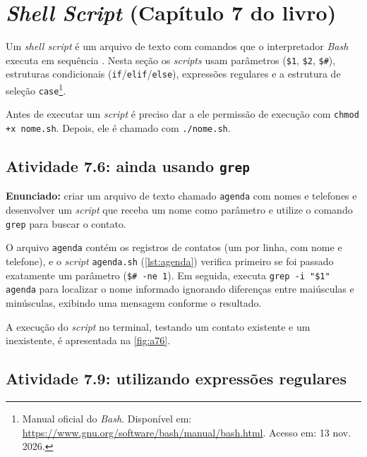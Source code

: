 \chapter{\textit{Shell Script} (Capítulo 7 do livro)}\label{cap:linux7}

Um \textit{shell script} é um arquivo de texto com comandos que o interpretador
\textit{Bash} executa em sequência \cite{peixoto2013}. Nesta seção os \textit{scripts} usam
parâmetros (\texttt{\$1}, \texttt{\$2}, \texttt{\$\#}), estruturas condicionais
(\texttt{if}/\texttt{elif}/\texttt{else}), expressões regulares e a estrutura de seleção
\texttt{case}\footnote{Manual oficial do \textit{Bash}. Disponível em:
\url{https://www.gnu.org/software/bash/manual/bash.html}. Acesso em: 13 nov. 2026.}.

Antes de executar um \textit{script} é preciso dar a ele permissão de execução com
\texttt{chmod +x nome.sh}. Depois, ele é chamado com \texttt{./nome.sh}.

\section{Atividade 7.6: ainda usando \texttt{grep}}\label{sec:a76}

\textbf{Enunciado:} criar um arquivo de texto chamado \texttt{agenda} com nomes e telefones e desenvolver um \textit{script} que receba um nome como parâmetro e utilize o comando \texttt{grep} para buscar o contato.

O arquivo \texttt{agenda} contém os registros de contatos (um por linha, com nome e telefone), e o \textit{script} \texttt{agenda.sh} (\autoref{lst:agenda}) verifica primeiro se foi passado exatamente um parâmetro (\texttt{\$\# -ne 1}). Em seguida, executa \texttt{grep -i "\$1" agenda} para localizar o nome informado ignorando diferenças entre maiúsculas e minúsculas, exibindo uma mensagem conforme o resultado.



A execução do \textit{script} no terminal, testando um contato existente e um inexistente, é apresentada na \autoref{fig:a76}.


\section{Atividade 7.9: utilizando expressões regulares}\label{sec:a79}


